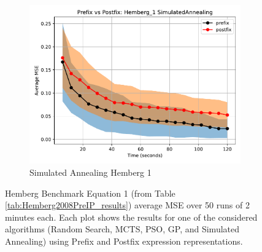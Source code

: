 \documentclass[runningheads]{llncs}
\begin{document}
\begin{figure}
    \vspace{0.5cm}
    
    \begin{subfigure}[b]{0.4\textwidth}
        \includegraphics[width=\linewidth, keepaspectratio]{Hemberg_Benchmarks/PrePostHemberg_1SimulatedAnnealing.pdf}
        \caption{Simulated Annealing Hemberg 1}
        \label{subfig:hemberg_1_SA}
    \end{subfigure}
    
    \caption{Hemberg Benchmark Equation 1 (from Table \ref{tab:Hemberg2008PreIP_results}) average MSE over 50 runs of 2 minutes each. Each plot shows the results for one of the considered algorithms (Random Search, MCTS, PSO, GP, and Simulated Annealing) using Prefix and Postfix expression representations.}
    \label{fig:Hemberg_1_Benchmarks}
\end{figure}
\end{document}
